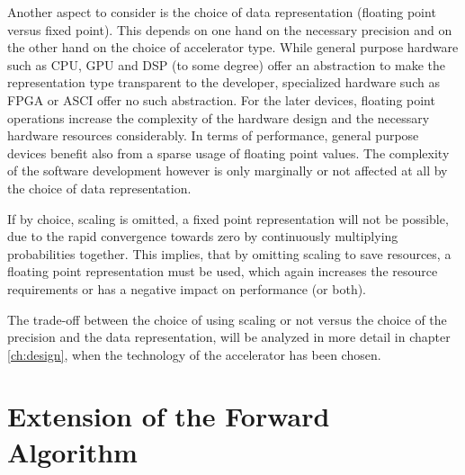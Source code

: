 \documentclass[mscthesis]{usiinfthesis}
\begin{document}
Another aspect to consider is the choice of data representation (floating point
versus fixed point). This depends on one hand on the necessary precision and on
the other hand on the choice of accelerator type. While general purpose
hardware such as CPU, GPU and DSP (to some degree) offer an abstraction to make
the representation type transparent to the developer, specialized hardware such
as FPGA or ASCI offer no such abstraction. For the later devices, floating
point operations increase the complexity of the hardware design and the
necessary hardware resources considerably. In terms of performance, general
purpose devices benefit also from a sparse usage of floating point values. The
complexity of the software development however is only marginally or not
affected at all by the choice of data representation.

If by choice, scaling is omitted, a fixed point representation will not be
possible, due to the rapid convergence towards zero by continuously multiplying
probabilities together. This implies, that by omitting scaling to save
resources, a floating point representation must be used, which again increases
the resource requirements or has a negative impact on performance (or both).

The trade-off between the choice of using scaling or not versus the choice of
the precision and the data representation, will be analyzed in more detail in
chapter \ref{ch:design}, when the technology of the accelerator has been
chosen.

\section{Extension of the Forward Algorithm}
\label{ch:analysis_extension}
\end{document}
